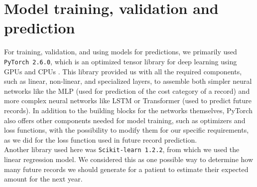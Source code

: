 \newpage

\section{Model training, validation and prediction}
\label{modelDesign}

For training, validation, and using models for predictions, we primarily used \texttt{PyTorch 2.6.0}, which is an optimized tensor library for deep learning using GPUs and CPUs \cite{pytorch}. This library provided us with all the required components, such as linear, non-linear, and specialized layers, to assemble both simpler neural networks like the MLP (used for prediction of the cost category of a record) and more complex neural networks like LSTM or Transformer (used to predict future records). In addition to the building blocks for the networks themselves, PyTorch also offers other components needed for model training, such as optimizers and loss functions, with the possibility to modify them for our specific requirements, as we did for the loss function used in future record prediction.
\\

Another library used here was \texttt{Scikit-learn 1.2.2}, from which we used the linear regression model. We considered this as one possible way to determine how many future records we should generate for a patient to estimate their expected amount for the next year.